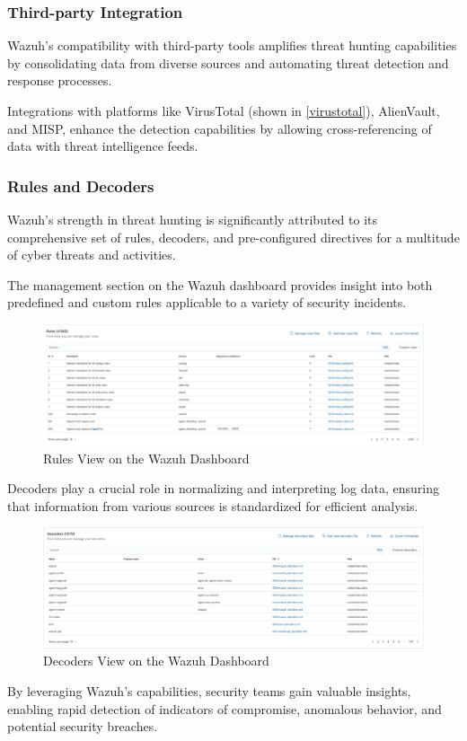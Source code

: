 \subsubsection{Third-party Integration}

Wazuh's compatibility with third-party tools amplifies threat hunting capabilities by consolidating data from diverse sources and automating threat detection and response processes.

Integrations with platforms like VirusTotal (shown in \ref{virustotal}), AlienVault, and MISP, enhance the detection capabilities by allowing cross-referencing of data with threat intelligence feeds.

\subsubsection{Rules and Decoders}

Wazuh's strength in threat hunting is significantly attributed to its comprehensive set of rules, decoders, and pre-configured directives for a multitude of cyber threats and activities.

The management section on the Wazuh dashboard provides insight into both predefined and custom rules applicable to a variety of security incidents.

\begin{figure}[H]
    \centering
    \includegraphics[width=\textwidth]{images/threat-hunting/rules.png}
    \caption{Rules View on the Wazuh Dashboard}
    \label{fig:wazuh-dashboard-rules}
\end{figure}

Decoders play a crucial role in normalizing and interpreting log data, ensuring that information from various sources is standardized for efficient analysis.

\begin{figure}[H]
    \centering
    \includegraphics[width=\textwidth]{images/threat-hunting/decoders.png}
    \caption{Decoders View on the Wazuh Dashboard}
    \label{fig:default-decoder-details}
\end{figure}

By leveraging Wazuh's capabilities, security teams gain valuable insights, enabling rapid detection of indicators of compromise, anomalous behavior, and potential security breaches.
